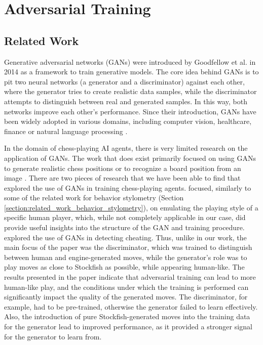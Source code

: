 \chapter{Adversarial Training}
\label{chapter:adversarial_training}

\section{Related Work}
\label{section:related_work_adversarial_training}
Generative adversarial networks (GANs) were introduced by Goodfellow et al. in 2014 \cite{GAN_Goodfellow} as a framework to train generative models.
The core idea behind GANs is to pit two neural networks (a generator and a discriminator) against each other, where the generator tries to create realistic data samples, while the discriminator attempts to distinguish between real and generated samples.
In this way, both networks improve each other's performance.
Since their introduction, GANs have been widely adopted in various domains, including computer vision, healthcare, finance or natural language processing \cite{GAN_uses}.

In the domain of chess-playing AI agents, there is very limited research on the application of GANs.
The work that does exist primarily focused on using GANs to generate realistic chess positions \cite{GAN_positions} or to recognize a board position from an image \cite{GAN_image}.
There are two pieces of research that we have been able to find that explored the use of GANs in training chess-playing agents.
\cite{GAN_style} focused, similarly to some of the related work for behavior stylometry (Section \ref{section:related_work_behavior_stylometry}), on emulating the playing style of a specific human player, which, while not completely applicable in our case, did provide useful insights into the structure of the GAN and training procedure.
\cite{GAN_anticheat} explored the use of GANs in detecting cheating.
Thus, unlike in our work, the main focus of the paper was the discriminator, which was trained to distinguish between human and engine-generated moves, while the generator's role was to play moves as close to Stockfish as possible, while appearing human-like.
The results presented in the paper indicate that adversarial training can lead to more human-like play, and the conditions under which the training is performed can significantly impact the quality of the generated moves.
The discriminator, for example, had to be pre-trained, otherwise the generator failed to learn effectively.
Also, the introduction of pure Stockfish-generated moves into the training data for the generator lead to improved performance, as it provided a stronger signal for the generator to learn from.

